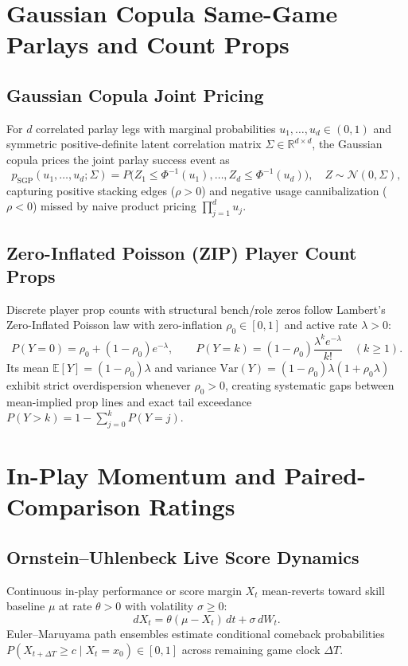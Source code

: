 \documentclass{article}
\begin{document}
\section{Gaussian Copula Same-Game Parlays and Count Props}
\subsection{Gaussian Copula Joint Pricing}
For $d$ correlated parlay legs with marginal probabilities $u_1, \dots, u_d \in (0, 1)$ and symmetric positive-definite latent correlation matrix $\Sigma \in \mathbb{R}^{d \times d}$, the Gaussian copula prices the joint parlay success event as
\begin{equation}
p_{\text{SGP}}(u_1, \dots, u_d; \Sigma) = P\bigl(Z_1 \le \Phi^{-1}(u_1), \dots, Z_d \le \Phi^{-1}(u_d)\bigr), \quad Z \sim \mathcal{N}(0, \Sigma),
\end{equation}
capturing positive stacking edges ($\rho > 0$) and negative usage cannibalization ($\rho < 0$) missed by naive product pricing $\prod_{j=1}^d u_j$.

\subsection{Zero-Inflated Poisson (ZIP) Player Count Props}
Discrete player prop counts with structural bench/role zeros follow Lambert's~\cite{lambert1992zero} Zero-Inflated Poisson law with zero-inflation $\rho_0 \in [0, 1]$ and active rate $\lambda > 0$:
\begin{equation}
P(Y = 0) = \rho_0 + (1 - \rho_0)e^{-\lambda}, \qquad P(Y = k) = (1 - \rho_0)\frac{\lambda^k e^{-\lambda}}{k!} \quad (k \ge 1).
\end{equation}
Its mean $\mathbb{E}[Y] = (1 - \rho_0)\lambda$ and variance $\mathrm{Var}(Y) = (1 - \rho_0)\lambda(1 + \rho_0 \lambda)$ exhibit strict overdispersion whenever $\rho_0 > 0$, creating systematic gaps between mean-implied prop lines and exact tail exceedance $P(Y > k) = 1 - \sum_{j=0}^k P(Y = j)$.

\section{In-Play Momentum and Paired-Comparison Ratings}
\subsection{Ornstein--Uhlenbeck Live Score Dynamics}
Continuous in-play performance or score margin $X_t$ mean-reverts toward skill baseline $\mu$ at rate $\theta > 0$ with volatility $\sigma \ge 0$:
\begin{equation}
dX_t = \theta(\mu - X_t)\,dt + \sigma\,dW_t.
\end{equation}
Euler--Maruyama path ensembles estimate conditional comeback probabilities $P(X_{t + \Delta T} \ge c \mid X_t = x_0) \in [0, 1]$ across remaining game clock $\Delta T$.
\end{document}
